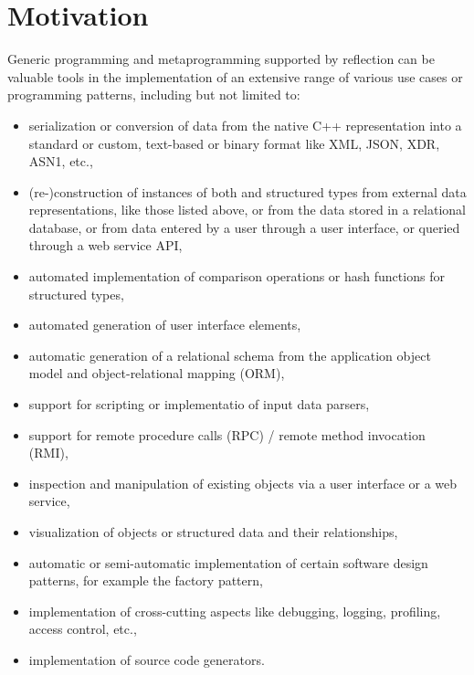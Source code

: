 \section{Motivation}

Generic programming and metaprogramming supported by reflection can be valuable
tools in the implementation of an extensive range of various use cases or
programming patterns, including but not limited to:

\begin{itemize}

\item serialization or conversion of data from the native C++ representation
into a standard or custom, text-based or binary format like XML, JSON, XDR, ASN1,
etc.,

\item (re-)construction of instances of both  and structured types
from external data representations, like those listed above, or
from the data stored in a relational database, or from data entered by
a user through a user interface, or queried through a web service API,

\item automated implementation of comparison operations or hash functions
for structured types,

\item automated generation of user interface elements,

\item automatic generation of a relational schema from the application
object model and object-relational mapping (ORM),

\item support for scripting or implementatio of input data parsers,

\item support for remote procedure calls (RPC) / remote method invocation (RMI),

\item inspection and manipulation of existing objects via a user interface
or a web service,

\item visualization of objects or structured data and their relationships,

\item automatic or semi-automatic implementation of certain software design
patterns, for example the factory pattern,

\item implementation of cross-cutting aspects like debugging, logging, profiling,
access control, etc.,

\item implementation of source code generators.

\end{itemize}

